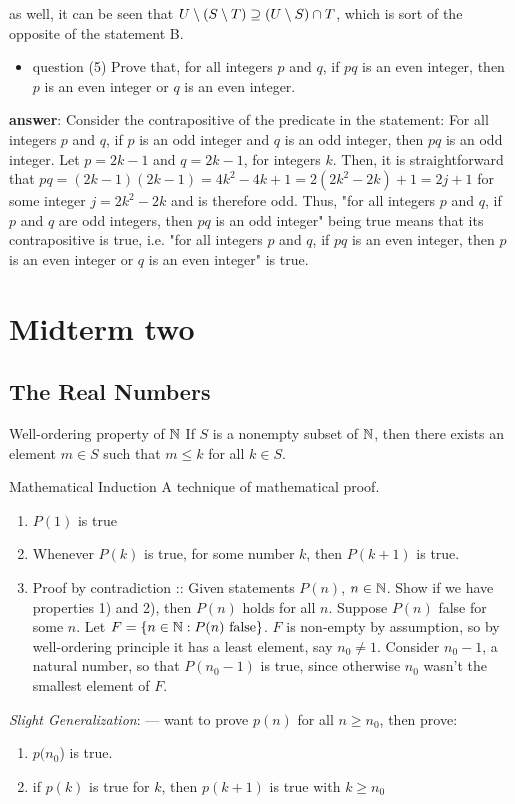 \documentclass[12pt]{article}
\begin{document}
as well, it can be seen that \(U\setminus(S\setminus{}T)\supseteq(U\setminus{}S)\cap{}T\), which is sort of the opposite of
the statement B.
\begin{itemize}
\item question (5) Prove that, for all integers \(p\) and \(q\), if \(pq\) is an even
integer, then \(p\) is an even integer or \(q\) is an even integer.
\end{itemize}
\textbf{answer}: Consider the contrapositive of the predicate in the statement: For all
integers \(p\) and \(q\), if \(p\) is an odd integer and \(q\) is an odd integer, then
\(pq\) is an odd integer. Let \(p=2k-1\) and \(q=2k-1\), for integers \(k\). Then, it is
straightforward that \(pq=(2k-1)(2k-1)=4k^{2}-4k+1=2(2k^{2}-2k)+1=2j+1\) for some
integer \(j=2k^{2}-2k\) and is therefore odd. Thus, "for all integers \(p\) and \(q\), if
\(p\) and \(q\) are odd integers, then \(pq\) is an odd integer" being true means that
its contrapositive is true, i.e. "for all integers \(p\) and \(q\), if \(pq\) is an
even integer, then \(p\) is an even integer or \(q\) is an even integer" is true.
\section{Midterm two}
\label{sec:orgef53c91}
\subsection{The Real Numbers}
\label{sec:org92372f3}
\begin{definition}{Well-ordering property of $\mathbb{N}$}
  If $S$ is a nonempty subset of $\mathbb{N}$, then there exists an element $m \in
  S$ such that $m \le k$ for all $k \in S$.
\end{definition}

\begin{definition}{Mathematical Induction}
  A technique of mathematical proof.
  \begin{enumerate}
  \item $P(1)$ is true
  \item Whenever $P(k)$ is true, for some number $k$, then $P(k+1)$ is true.
  \item Proof by contradiction :: Given statements $P(n)$, $n\in\mathbb{N}$. Show
    if we have properties 1) and 2), then $P(n)$ holds for all $n$. Suppose
    $P(n)$ false for some $n$. Let $F=\{n\in\mathbb{N} : P(n) \text{ false}\}$.
    $F$ is non-empty by assumption, so by well-ordering principle it has a least
    element, say $n_{0}\ne{}1$. Consider $n_{0}-1$, a natural number, so that
    $P(n_{0}-1)$ is true, since otherwise $n_{0}$ wasn't the smallest element of
    $F$.
  \end{enumerate}
  \textit{Slight Generalization}: --- want to prove $p(n)$ for all $n\ge n_0$,
  then prove:
  \begin{enumerate}
     \item $p(n_0$) is true.
     \item if $p(k)$ is true for $k$, then $p(k+1)$ is true with $k\ge n_0$
  \end{enumerate}
\end{definition}
\end{document}

